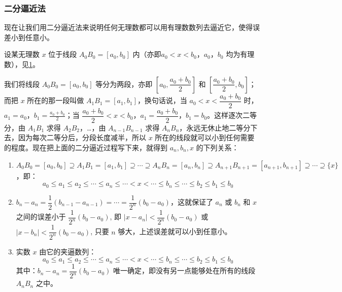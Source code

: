\subsubsection{二分逼近法}

现在让我们用二分逼近法来说明任何无理数都可以用有理数数列去逼近它，使得误差小到任意小。

设某无理数 $x$ 位于线段 $A_0B_0=[a_0,b_0]$ 内（亦即$a_0<x<b_0$，$a_0$，$b_0$ 均为有理数），见\cref{fig:rationalnumber}。

\begin{figure}
    \caption{}\label{fig:rationalnumber}
\end{figure}

{\linespread{1.6}\selectfont 我们将线段 $A_0B_0=[a_0,b_0]$ 等分为两段，亦即 $\left[a_0,\dfrac{a_0+b_0}{2}\right]$ 和 $\left[\dfrac{a_0+b_0}{2},b_0\right]$；而把 $x$ 所在的那一段叫做 $A_1B_1=[a_1,b_1]$，换句话说，当 $a_0<x<\dfrac{a_0+b_0}{2}$ 时，$a_1=a_0$，$b_1=\frac{a_0+b_0}{2}$；当 $\dfrac{a_0+b_0}{2}<x<b_0$，$a_1=\dfrac{a_0+b_0}{2}$，$b_1=b_0$。这样逐次二等分，由 $A_1B_1$ 求得 $A_2B_2$，\ldots，由 $A_{n-1}B_{n-1}$ 求得 $A_nB_n$，永远无休止地二等分下去，因为每次二等分后，分段长度减半，所以 $x$ 所在的线段就可以小到任何需要的程度。现在把上面的二分逼近过程写下来，就得到 $a_n,b_n,x$ 的下列关系：\par}
\begin{enumerate}
    \item $A_0B_0=[a_0, b_0]\supseteq A_1B_1 =[a_1,b_1]
    \supseteq \cdots \supseteq A_nB_n=[a_n, b_n]\supseteq A_{n+1}B_{n+1}=[a_{n+1},b_{n+1}]\supseteq \cdots \supseteq \{x\}$，即：
\[a_0\leqslant a_1\leqslant a_2\le\cdots\leqslant a_n\leqslant \cdots <x<\cdots\leqslant b_n\le\cdots\leqslant b_2\leqslant b_1\leqslant b_0\]

\item {\linespread{1.6}\selectfont $b_n-a_n=\dfrac{1}{2}(b_{n-1}-a_{n-1})=\cdots=\dfrac{1}{2^n}(b_0-a_0)$，这就保证了 $a_n$ 或 $b_n$ 和 $x$ 之间的误差小于 $\dfrac{1}{2^n}(b_0-a_0)$, 即 $|x-a_n|<\dfrac{1}{2^n}(b_0-a_0)$ 或 $|x-b_n|<\dfrac{1}{2^n}(b_0-a_0)$, 只要 $n$ 够大，上述误差就可以小到任意小。\par}
\item 实数 $x$ 由它的夹逼数列：
\[a_0\leqslant a_1\leqslant a_2\le\cdots\leqslant a_n\leqslant \cdots <x<\cdots\leqslant b_n\le\cdots\leqslant b_2\leqslant b_1\leqslant b_0\]
其中：$b_n-a_n=\dfrac{1}{2^n}(b_0-a_0)$ 唯一确定，即没有另一点能够处在所有的线段 $A_nB_n$ 之中。
\end{enumerate}

